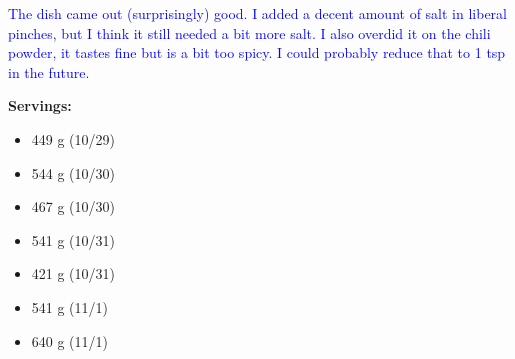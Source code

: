 \textcolor{blue}{The dish came out (surprisingly) good.  I added a decent amount of salt in liberal pinches, but I think it still needed a bit more salt.  I also overdid it on the chili powder, it tastes fine but is a bit too spicy.  I could probably reduce that to 1 tsp in the future.}

\textbf{Servings:}

\begin{itemize}
\item 449 g (10/29)
\item 544 g (10/30)
\item 467 g (10/30)
\item 541 g (10/31)
\item 421 g (10/31)
\item 541 g (11/1)
\item 640 g (11/1)
\end{itemize}

